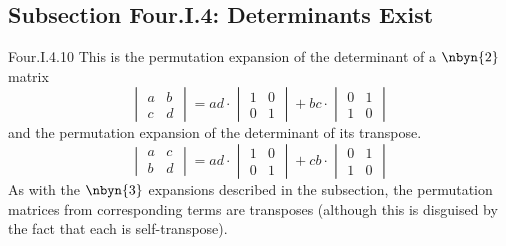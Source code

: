 \subsection{Subsection Four.I.4: Determinants Exist}
\begin{ans}{Four.I.4.10}
      This is the permutation expansion of the determinant of a
      $\nbyn{2}$ matrix
      \begin{equation*}
        \begin{vmatrix}
          a  &b  \\
          c  &d
        \end{vmatrix}
         =ad\cdot \begin{vmatrix}
                    1  &0  \\
                    0  &1
                  \end{vmatrix}
         +bc\cdot \begin{vmatrix}
                    0  &1 \\
                    1  &0
                  \end{vmatrix}
      \end{equation*}
      and the permutation expansion of the determinant of its transpose.
      \begin{equation*}
         \begin{vmatrix}
            a  &c  \\
            b  &d
         \end{vmatrix}
         =ad\cdot\begin{vmatrix}
                    1  &0  \\
                    0  &1
                 \end{vmatrix}
         +cb\cdot\begin{vmatrix}
                   0  &1 \\
                   1  &0
                 \end{vmatrix}
       \end{equation*}
       As with the $\nbyn{3}$ expansions described in the subsection,
       the permutation matrices from corresponding terms are
       transposes (although this is disguised by the fact that each
       is self-transpose).
    
\end{ans}
